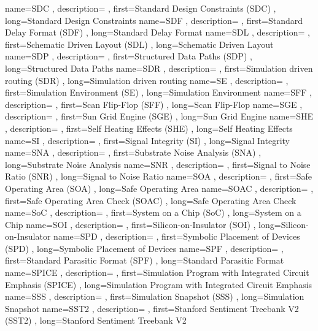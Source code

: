 { name={SDC}
, description={}
, first={Standard Design Constraints (SDC)}
, long={Standard Design Constraints}
}
{ name={SDF}
, description={}
, first={Standard Delay Format (SDF)}
, long={Standard Delay Format}
}
{ name={SDL}
, description={}
, first={Schematic Driven Layout (SDL)}
, long={Schematic Driven Layout}
}
{ name={SDP}
, description={}
, first={Structured Data Paths (SDP)}
, long={Structured Data Paths}
}
{ name={SDR}
, description={}
, first={Simulation driven routing (SDR)}
, long={Simulation driven routing}
}
{ name={SE}
, description={}
, first={Simulation Environment (SE)}
, long={Simulation Environment}
}
{ name={SFF}
, description={}
, first={Scan Flip-Flop (SFF)}
, long={Scan Flip-Flop}
}
{ name={SGE}
, description={}
, first={Sun Grid Engine (SGE)}
, long={Sun Grid Engine}
}
{ name={SHE}
, description={}
, first={Self Heating Effects (SHE)}
, long={Self Heating Effects}
}
{ name={SI}
, description={}
, first={Signal Integrity (SI)}
, long={Signal Integrity}
}
{ name={SNA}
, description={}
, first={Substrate Noise Analysis (SNA)}
, long={Substrate Noise Analysis}
}
{ name={SNR}
, description={}
, first={Signal to Noise Ratio (SNR)}
, long={Signal to Noise Ratio}
}
{ name={SOA}
, description={}
, first={Safe Operating Area (SOA)}
, long={Safe Operating Area}
}
{ name={SOAC}
, description={}
, first={Safe Operating Area Check (SOAC)}
, long={Safe Operating Area Check}
}
{ name={SoC}
, description={}
, first={System on a Chip (SoC)}
, long={System on a Chip}
}
{ name={SOI}
, description={}
, first={Silicon-on-Insulator (SOI)}
, long={Silicon-on-Insulator}
}
{ name={SPD}
, description={}
, first={Symbolic Placement of Devices (SPD)}
, long={Symbolic Placement of Devices}
}
{ name={SPF}
, description={}
, first={Standard Parasitic Format (SPF)}
, long={Standard Parasitic Format}
}
{ name={SPICE}
, description={}
, first={Simulation Program with Integrated Circuit Emphasis (SPICE)}
, long={Simulation Program with Integrated Circuit Emphasis}
}
{ name={SSS}
, description={}
, first={Simulation Snapshot (SSS)}
, long={Simulation Snapshot}
}
{ name={SST2}
, description={}
, first={Stanford Sentiment Treebank V2 (SST2)}
, long={Stanford Sentiment Treebank V2}
}
